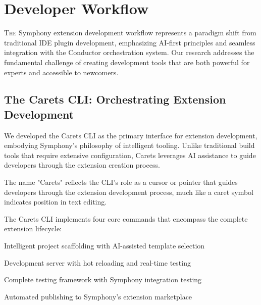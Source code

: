 
\section*{Developer Workflow}

\lettrine{T}{he} Symphony extension development workflow represents a paradigm shift from traditional IDE plugin development, emphasizing AI-first principles and seamless integration with the Conductor orchestration system. Our research addresses the fundamental challenge of creating development tools that are both powerful for experts and accessible to newcomers.

\subsection*{The Carets CLI: Orchestrating Extension Development}

We developed the Carets CLI as the primary interface for extension development, embodying Symphony's philosophy of intelligent tooling. Unlike traditional build tools that require extensive configuration, Carets leverages AI assistance to guide developers through the extension creation process.

\begin{infobox}[title=Carets CLI Philosophy]
The name "Carets" reflects the CLI's role as a cursor or pointer that guides developers through the extension development process, much like a caret symbol indicates position in text editing.
\end{infobox}

The Carets CLI implements four core commands that encompass the complete extension lifecycle:

\begin{description}[leftmargin=3cm,labelwidth=2.5cm]
    \item[\textbf{carets new}] Intelligent project scaffolding with AI-assisted template selection
    \item[\textbf{carets dev}] Development server with hot reloading and real-time testing
    \item[\textbf{carets test}] Complete testing framework with Symphony integration testing
    \item[\textbf{carets publish}] Automated publishing to Symphony's extension marketplace
\end{description}

